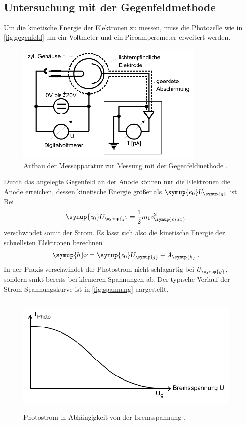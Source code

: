 \subsection{Untersuchung mit der Gegenfeldmethode}
Um die kinetische Energie der Elektronen zu messen, muss die Photozelle wie in \autoref{fig:gegenfeld} 
um ein Voltmeter und ein Picoamperemeter erweitert werden.
\begin{figure}
    \centering
    \includegraphics[height = 6cm]{gegenfeld.pdf}
    \caption{Aufbau der Messapparatur zur Messung mit der Gegenfeldmethode \cite{ap500}.}
    \label{fig:gegenfeld}
\end{figure}
Durch das angelegte Gegenfeld an der Anode
können nur die Elektronen die Anode erreichen, dessen kinetische Energie größer als $\symup{e_0}U_{\symup{g}}$
ist. Bei 
\begin{equation*}
    \symup{e_0}U_{\symup{g}} = \frac{1}{2} m_0 v_{\symup{max}}^2
\end{equation*}
verschwindet somit der Strom. Es lässt sich also die kinetische Energie der schnellsten Elektronen 
berechnen
\begin{equation*}
    \symup{h} \nu = \symup{e_0}U_{\symup{g}}  + A_{\symup{k}} \; .
\end{equation*}
In der Praxis verschwindet der Photostrom nicht schlagartig bei $U_{\symup{g}}$, sondern sinkt bereits 
bei kleineren Spannungen ab. Der typische Verlauf der Strom-Spannungskurve ist in \autoref{fig:spannung}
dargestellt. 
\begin{figure}
    \centering
    \includegraphics[height = 6cm]{energie.pdf}
    \caption{Photostrom in Abhängigkeit von der Bremsspannung \cite{ap500}.}
    \label{fig:energie}
\end{figure}
